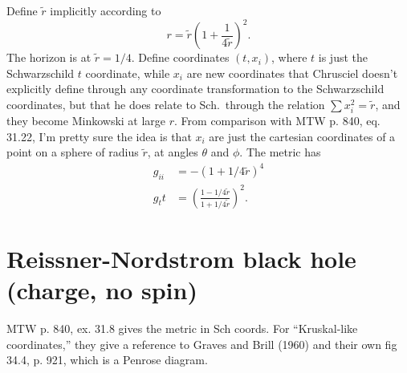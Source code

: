 \documentclass{article}
\begin{document}
Define $\tilde{r}$ implicitly according to
\begin{equation}
  r = \tilde{r}\left(1+\frac{1}{4\tilde{r}}\right)^2.
\end{equation}
The horizon is at $\tilde{r}=1/4$. Define coordinates $(t,x_i)$, where $t$ is
just the Schwarzschild $t$ coordinate, while $x_i$ are new coordinates that Chrusciel doesn't
explicitly define through any coordinate transformation to the Schwarzschild coordinates,
but that he does relate to Sch.~through the relation $\sum x_i^2=\tilde{r}$, and they
become Minkowski at large $r$. From comparison with MTW p. 840, eq. 31.22, I'm pretty
sure the idea is that $x_i$ are just the cartesian coordinates of a point on a sphere
of radius $\tilde{r}$, at angles $\theta$ and $\phi$. The metric has
\begin{align}
  g_{ii} &= -(1+1/4\tilde{r})^4 \\
  g_tt &= \left(\frac{1-1/4\tilde{r}}{1+1/4\tilde{r}}\right)^2.
\end{align}

\section{Reissner-Nordstrom black hole (charge, no spin)}

MTW p. 840, ex. 31.8 gives the metric in Sch coords. For ``Kruskal-like coordinates,''
they give a reference to Graves and Brill (1960) and their own fig 34.4, p. 921,
which is a Penrose diagram.
\end{document}
